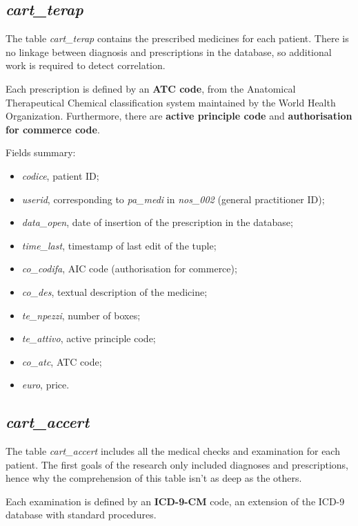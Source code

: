 \subsection{\textit{cart\_terap}}
The table \textit{cart\_terap} contains the prescribed medicines for each patient. There is no linkage between diagnosis and prescriptions in the database, so additional work is required to detect correlation.

Each prescription is defined by an\textbf{ ATC code}, from the Anatomical Therapeutical Chemical classification system maintained by the World Health Organization. Furthermore, there are \textbf{active principle code} and \textbf{authorisation for commerce code}.

Fields summary:
\begin{itemize}
	\item \textit{codice}, patient ID;
	\item \textit{userid}, corresponding to \textit{pa\_medi }in \textit{nos\_002} (general practitioner ID);
	\item \textit{data\_open}, date of insertion of the prescription in the database;
	\item \textit{time\_last}, timestamp of last edit of the tuple;
	\item \textit{co\_codifa}, AIC code (authorisation for commerce);
	\item \textit{co\_des}, textual description of the medicine;
	\item \textit{te\_npezzi}, number of boxes;
	\item \textit{te\_attivo}, active principle code;
	\item \textit{co\_atc}, ATC code;
	\item \textit{euro}, price.
\end{itemize}

\subsection{\textit{cart\_accert}}
The table \textit{cart\_accert} includes all the medical checks and examination for each patient. The first goals of the research only included diagnoses and prescriptions, hence why the comprehension of this table isn't as deep as the others.

Each examination is defined by an \textbf{ICD-9-CM} code, an extension of the ICD-9 database with standard procedures. 

